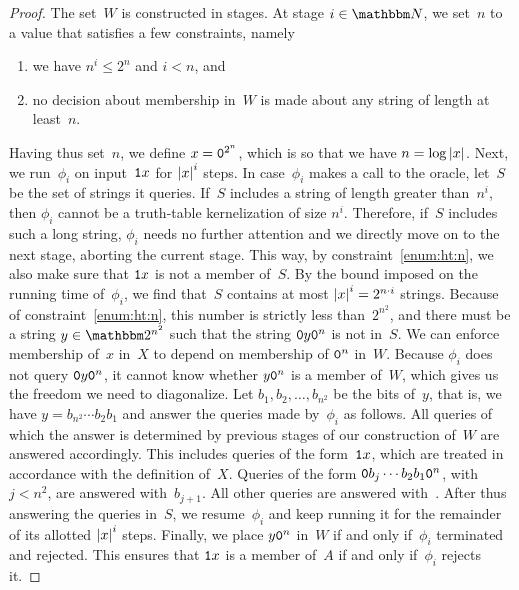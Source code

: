 \begin{proof}
  The set~$W$ is constructed in stages.
  At stage $i \in \bbN$, we set~$n$ to a value that satisfies a few constraints, namely
  \begin{enumerate}
  \item\label{enum:ht:n}
    we have $n^i \le 2^n$ and $i < n$, and
  \item
    no decision about membership in~$W$ is made about any string of length at least~$n$.
  \end{enumerate}
  Having thus set~$n$, we define $x = \textnormal{\texttt{0}}^{2^n}$, which is so that we have $n = \log{\lvert x\rvert}$.
  Next, we run~$\phi_i$ on input~$\textnormal{\texttt{1}}x$ for ${\lvert x\rvert}^i$ steps.
  In case~$\phi_i$ makes a call to the oracle, let~$S$ be the set of strings it queries.
  If~$S$ includes a string of length greater than~$n^i$, then $\phi_i$ cannot be a truth-table kernelization of size $n^i$.
  Therefore, if~$S$ includes such a long string, $\phi_i$ needs no further attention and we directly move on to the next stage, aborting the current stage.
  This way, by constraint~\ref{enum:ht:n}, we also make sure that $\textnormal{\texttt{1}}x$ is not a member of~$S$.
  By the bound imposed on the running time of~$\phi_i$, we find that~$S$ contains at most ${\lvert x\rvert}^i = 2^{n \cdot i}$ strings.
  Because of constraint~\ref{enum:ht:n}, this number is strictly less than~$2^{n^2}$, and there must be a string $y \in \binary^{n^2}$ such that the string $\textnormal{\texttt{0}}y\textnormal{\texttt{0}}^n$ is not in~$S$.
  We can enforce membership of~$x$ in~$X$ to depend on membership of $\textnormal{\texttt{0}}^n$ in~$W$.
  Because $\phi_i$ does not query $\textnormal{\texttt{0}}y\textnormal{\texttt{0}}^n$, it cannot know whether $y\textnormal{\texttt{0}}^n$ is a member of~$W$, which gives us the freedom we need to diagonalize.
  Let $b_1, b_2, \ldots, b_{n^2}$ be the bits of~$y$, that is, we have $y = b_{n^2}\cdots b_2b_1$ and answer the queries made by~$\phi_i$ as follows.
  All queries of which the answer is determined by previous stages of our construction of~$W$ are answered accordingly.
  This includes queries of the form~$\textnormal{\texttt{1}}x$, which are treated in accordance with the definition of~$X$.
  Queries of the form $\textnormal{\texttt{0}}b_j\cdots b_2b_1\textnormal{\texttt{0}}^n$, with $j < n^2$, are answered with~$b_{j + 1}$.
  All other queries are answered with~.
  After thus answering the queries in~$S$, we resume~$\phi_i$ and keep running it for the remainder of its allotted ${\lvert x\rvert}^i$ steps.
  Finally, we place $y\textnormal{\texttt{0}}^n$ in~$W$ if and only if~$\phi_i$ terminated and rejected.
  This ensures that $\textnormal{\texttt{1}}x$ is a member of~$A$ if and only if~$\phi_i$ rejects it.


\end{proof}
